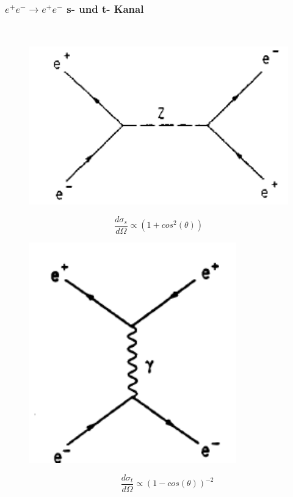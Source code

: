 \begin{frame}
	\frametitle{ $e^+e^- \rightarrow e^+e^-$ s- und t- Kanal}
		\begin{minipage}{0.49\linewidth}
			\ \\
			\begin{figure}
				\includegraphics[width=1.1\textwidth]{graphics/annihilationee.png}
			\end{figure}
		\begin{equation*}
		\frac{d\sigma_s}{d\Omega} \propto (1+cos^2(\theta))
		\end{equation*}
	\end{minipage}
	\begin{minipage}{0.49\linewidth}
		\begin{figure}
			\includegraphics[width=0.8\textwidth]{graphics/BhabbaStreuungpresentation.png}
		\end{figure}
	\begin{equation*}
	\qquad\frac{d\sigma_t}{d\Omega} \propto (1-cos(\theta))^{-2}
	\end{equation*}
	\end{minipage}
\end{frame}
